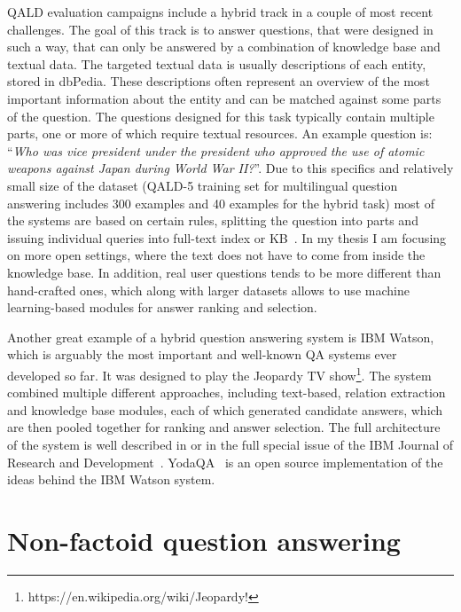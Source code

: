 QALD evaluation campaigns include a hybrid track in a couple of most recent challenges.
The goal of this track is to answer questions, that were designed in such a way, that can only be answered by a combination of knowledge base and textual data.
The targeted textual data is usually descriptions of each entity, stored in dbPedia.
These descriptions often represent an overview of the most important information about the entity and can be matched against some parts of the question.
The questions designed for this task typically contain multiple parts, one or more of which require textual resources.
An example question is: ``\textit{Who was vice president under the president who approved the use of atomic weapons against Japan during World War II?}''.
Due to this specifics and relatively small size of the dataset (QALD-5 training set for multilingual question answering includes 300 examples and 40 examples for the hybrid task) most of the systems are based on certain rules, \eg splitting the question into parts and issuing individual queries into full-text index or KB~\cite{park2015isoft,usbeck2015hawk}.
In my thesis I am focusing on more open settings, where the text does not have to come from inside the knowledge base.
In addition, real user questions tends to be more different than hand-crafted ones, which along with larger datasets allows to use machine learning-based modules for answer ranking and selection.

Another great example of a hybrid question answering system is IBM Watson, which is arguably the most important and well-known QA systems ever developed so far.
It was designed to play the Jeopardy TV show\footnote{https://en.wikipedia.org/wiki/Jeopardy!}.
The system combined multiple different approaches, including text-based, relation extraction and knowledge base modules, each of which generated candidate answers, which are then pooled together for ranking and answer selection.
The full architecture of the system is well described in \cite{ferrucci2010building} or in the full special issue of the IBM Journal of Research and Development~\cite{ibm_watson_special_issue}.
YodaQA~\cite{baudivs2015yodaqa} is an open source implementation of the ideas behind the IBM Watson system.


\section{Non-factoid question answering}
\label{section:relatedwork:non-factoid}

